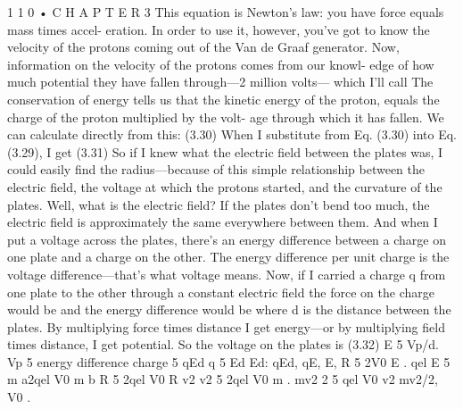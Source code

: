 \documentclass[10pt,oneside]{article}
\begin{document}
1 1 0 • C H A P T E R  3 This equation is Newton’s law: you have force equals mass times accel- eration. In order to use it, however, you’ve got to know the velocity of the protons coming out of the Van de Graaf generator. Now, information on the velocity of the protons comes from our knowl- edge of how much potential they have fallen through---2 million volts--- which I’ll call The conservation of energy tells us that the kinetic energy of the proton, equals the charge of the proton multiplied by the volt- age through which it has fallen. We can calculate directly from this: (3.30) When I substitute from Eq. (3.30) into Eq. (3.29), I get (3.31) So if I knew what the electric field between the plates was, I could easily find the radius---because of this simple relationship between the electric field, the voltage at which the protons started, and the curvature of the plates. Well, what is the electric field? If the plates don’t bend too much, the electric field is approximately the same everywhere between them. And when I put a voltage across the plates, there’s an energy difference between a charge on one plate and a charge on the other. The energy difference per unit charge is the voltage difference---that’s what voltage means. Now, if I carried a charge q from one plate to the other through a constant electric field the force on the charge would be and the energy difference would be where d is the distance between the plates. By multiplying force times distance I get energy---or by multiplying field times distance, I get potential. So the voltage on the plates is (3.32) E 5 Vp/d. Vp 5 energy difference charge 5 qEd q 5 Ed Ed: qEd, qE, E, R 5 2V0 E . qel E 5 m a2qel V0 m b R 5 2qel V0 R v2 v2 5 2qel V0 m . mv2 2 5 qel V0 v2 mv2/2, V0 .\par
\end{document}

